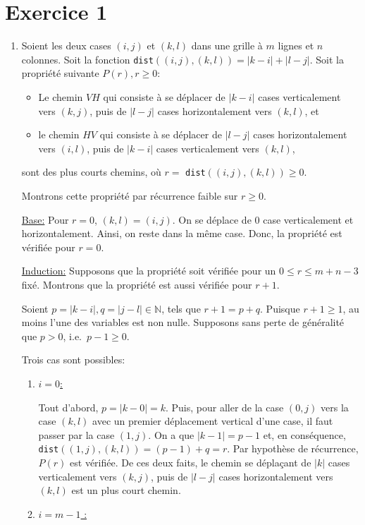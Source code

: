 \documentclass[12pt,a4paper]{article}
\begin{document}
\section{Exercice 1}
\begin{enumerate}
\item Soient les deux cases $(i,j)$ et $(k,l)$ dans une grille \`a $m$ 
lignes et $n$ colonnes. 
Soit la fonction \texttt{dist}$((i,j),(k,l))=|k-i|+|l-j|$. Soit la 
propri\'et\'e 
suivante $P(r), r \geq 0$:
\begin{itemize}
\item Le chemin $VH$ qui consiste \`a se d\'eplacer de $|k-i|$ cases 
verticalement vers $(k,j)$, puis de $|l-j|$ cases horizontalement vers $(k,l)$, 
et
\item le chemin $HV$ qui consiste \`a se d\'eplacer de $|l-j|$ cases 
horizontalement vers $(i,l)$, puis de $|k-i|$ cases verticalement vers $(k,l)$,
\end{itemize}
sont des plus courts chemins, o\`u $r=$ \texttt{dist}$((i,j),(k,l)) \geq 0$.

Montrons cette propri\'et\'e par r\'ecurrence faible sur $r \geq 0$.

\underline{Base:} Pour $r=0$, $(k,l)=(i,j)$. On se d\'eplace de $0$ 
case verticalement et horizontalement. Ainsi, on reste dans la m\^eme case. 
Donc, la propri\'et\'e est v\'erifi\'ee pour $r=0$.

\underline{Induction:} Supposons que la propri\'et\'e soit v\'erifi\'ee pour un 
$0 \leq r \leq m+n-3$ fix\'e.
Montrons que la propri\'et\'e est aussi v\'erifi\'ee pour $r+1$.

Soient $p=|k-i|, q=|j-l| \in \mathbb{N}$, tels que $r+1=p+q$. Puisque 
$r+1 \geq1$, au moins l'une des variables est non nulle. Supposons sans perte 
de g\'en\'eralit\'e que $p > 0$, i.e.\ $p-1 \geq 0$.

Trois cas sont possibles:
\begin{enumerate}
  \item \underline{$i=0$:} 

  Tout d'abord, $p=|k-0|=k$. Puis, pour aller de la case $(0,j)$ vers la case 
$(k,l)$ avec un premier   d\'eplacement vertical d'une case, il faut passer par 
la case $(1,j)$. On a que $|k-1|=p-1$ et, en 
cons\'equence, \texttt{dist}$((1,j),(k,l))=(p-1)+q=r$. Par 
hypoth\`ese de r\'ecurrence, $P(r)$ est v\'erifi\'ee. De ces deux faits, le 
chemin se d\'epla\c{c}ant de $|k|$ cases verticalement vers $(k,j)$, puis de 
$|l-j|$ cases horizontalement vers $(k,l)$ est un plus court chemin.
  \item \underline{$i=m-1$ :} 


\end{enumerate}
\end{enumerate}
\end{document}
